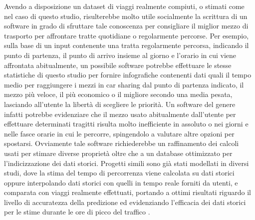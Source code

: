 Avendo a disposizione un dataset di viaggi realmente compiuti, o stimati come nel caso di questo studio, risulterebbe molto utile socialmente la scrittura di un software in grado di sfruttare tale conoscenza per consigliare il miglior mezzo di trasporto per affrontare tratte quotidiane o regolarmente percorse. Per esempio, sulla base di un input contenente una tratta regolarmente percorsa, indicando il punto di partenza, il punto di arrivo insieme al giorno e l'orario in cui viene affrontata abitualmente, un possibile software potrebbe effettuare le stesse statistiche di questo studio per fornire infografiche contenenti dati quali il tempo medio per raggiungere i mezzi in car sharing dal punto di partenza indicato, il mezzo più veloce, il più economico o il migliore secondo una media pesata, lasciando all'utente la libertà di scegliere le priorità. Un software del genere infatti potrebbe evidenziare che il mezzo usato abitualmente dall'utente per effettuare determinati tragitti risulta molto inefficiente in assoluto o nei giorni e nelle fasce orarie in cui le percorre, spingendolo a valutare altre opzioni per spostarsi. Ovviamente tale software richiederebbe un raffinamento dei calcoli usati per stimare diverse proprietà oltre che a un database ottimizzato per l'indicizzazione dei dati storici. Progetti simili sono già stati modellati in diversi studi, dove la stima del tempo di percorrenza viene calcolata su dati storici oppure interpolando dati storici con quelli in tempo reale forniti da utenti, e comparata con viaggi realmente effettuati, portando a ottimi risultati riguardo il livello di accuratezza della predizione ed evidenziando l'efficacia dei dati storici per le stime durante le ore di picco del traffico \cite{deeshma2015travel}\cite{chien2003dynamic}.












